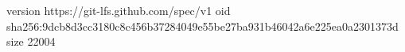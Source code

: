version https://git-lfs.github.com/spec/v1
oid sha256:9dcb8d3cc3180c8c456b37284049e55be27ba931b46042a6e225ea0a2301373d
size 22004
